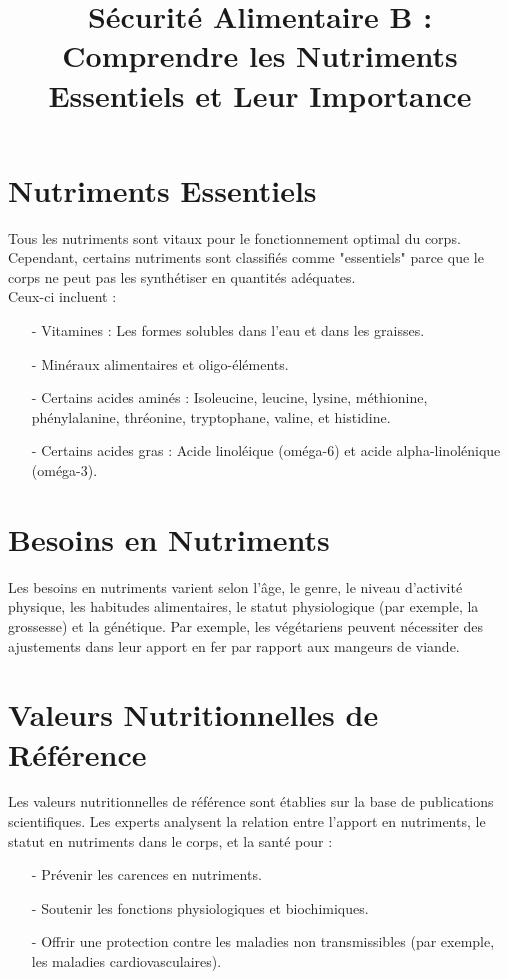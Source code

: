 \documentclass[11pt]{article}
\title{Sécurité Alimentaire B : Comprendre les Nutriments Essentiels et Leur Importance}
\begin{document}
\maketitle

\section{Nutriments Essentiels}
Tous les nutriments sont vitaux pour le fonctionnement optimal du corps. Cependant, certains nutriments sont classifiés comme "essentiels" parce que le corps ne peut pas les synthétiser en quantités adéquates.\\
Ceux-ci incluent :

\begin{itemize}
    \item[-] Vitamines : Les formes solubles dans l'eau et dans les graisses.
    \item[-] Minéraux alimentaires et oligo-éléments.
    \item[-] Certains acides aminés : Isoleucine, leucine, lysine, méthionine, phénylalanine, thréonine, tryptophane, valine, et histidine.
    \item[-] Certains acides gras : Acide linoléique (oméga-6) et acide alpha-linolénique (oméga-3).
\end{itemize}

\section{Besoins en Nutriments}
Les besoins en nutriments varient selon l'âge, le genre, le niveau d'activité physique, les habitudes alimentaires, le statut physiologique (par exemple, la grossesse) et la génétique. Par exemple, les végétariens peuvent nécessiter des ajustements dans leur apport en fer par rapport aux mangeurs de viande.

\newpage

\section{Valeurs Nutritionnelles de Référence}
Les valeurs nutritionnelles de référence sont établies sur la base de publications scientifiques. Les experts analysent la relation entre l'apport en nutriments, le statut en nutriments dans le corps, et la santé pour :

\begin{itemize}
    \item[-] Prévenir les carences en nutriments.
    \item[-] Soutenir les fonctions physiologiques et biochimiques.
    \item[-] Offrir une protection contre les maladies non transmissibles (par exemple, les maladies cardiovasculaires).
\end{itemize}
\end{document}
